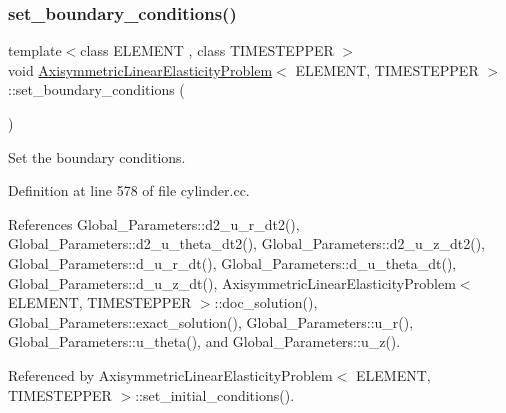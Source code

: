 \mbox{\label{classAxisymmetricLinearElasticityProblem_ad6419d0572a6e869a5b9ba3c5aac3144}} 
\subsubsection{\texorpdfstring{set\+\_\+boundary\+\_\+conditions()}{set\_boundary\_conditions()}}
{\footnotesize\ttfamily template$<$class E\+L\+E\+M\+E\+NT , class T\+I\+M\+E\+S\+T\+E\+P\+P\+ER $>$ \\
void \hyperlink{classAxisymmetricLinearElasticityProblem}{Axisymmetric\+Linear\+Elasticity\+Problem}$<$ E\+L\+E\+M\+E\+NT, T\+I\+M\+E\+S\+T\+E\+P\+P\+ER $>$\+::set\+\_\+boundary\+\_\+conditions (\begin{DoxyParamCaption}{ }\end{DoxyParamCaption})}



Set the boundary conditions. 



Definition at line 578 of file cylinder.\+cc.



References Global\+\_\+\+Parameters\+::d2\+\_\+u\+\_\+r\+\_\+dt2(), Global\+\_\+\+Parameters\+::d2\+\_\+u\+\_\+theta\+\_\+dt2(), Global\+\_\+\+Parameters\+::d2\+\_\+u\+\_\+z\+\_\+dt2(), Global\+\_\+\+Parameters\+::d\+\_\+u\+\_\+r\+\_\+dt(), Global\+\_\+\+Parameters\+::d\+\_\+u\+\_\+theta\+\_\+dt(), Global\+\_\+\+Parameters\+::d\+\_\+u\+\_\+z\+\_\+dt(), Axisymmetric\+Linear\+Elasticity\+Problem$<$ E\+L\+E\+M\+E\+N\+T, T\+I\+M\+E\+S\+T\+E\+P\+P\+E\+R $>$\+::doc\+\_\+solution(), Global\+\_\+\+Parameters\+::exact\+\_\+solution(), Global\+\_\+\+Parameters\+::u\+\_\+r(), Global\+\_\+\+Parameters\+::u\+\_\+theta(), and Global\+\_\+\+Parameters\+::u\+\_\+z().



Referenced by Axisymmetric\+Linear\+Elasticity\+Problem$<$ E\+L\+E\+M\+E\+N\+T, T\+I\+M\+E\+S\+T\+E\+P\+P\+E\+R $>$\+::set\+\_\+initial\+\_\+conditions().

\mbox{\label{classAxisymmetricLinearElasticityProblem_a6b0263b6f783652a1d8151948f4b9430}} 
